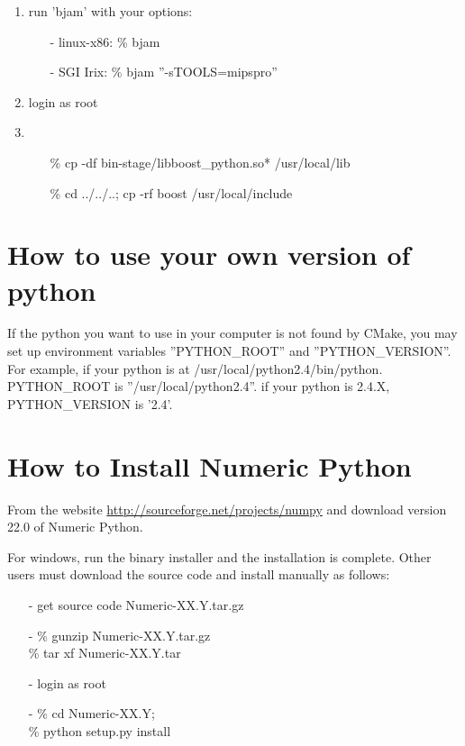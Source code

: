 \begin{enumerate}
     \item
       run 'bjam' with your options:
       \begin{itemize}
	 \item[-] linux-x86: {\% bjam}
	 \item[-] SGI Irix: {\% bjam ''-sTOOLS=mipspro''}
       \end{itemize}

     \item
       login as root
    
     \item

       \begin{itemize}
	 \item[\%] cp -df bin-stage/libboost\_python.so* /usr/local/lib
	 \item[\%] cd ../../..; cp -rf boost /usr/local/include
       \end{itemize}
       \normalcolor

  \end{enumerate}


\section{How to use your own version of python}

   If the python you want to use in your computer is not found by CMake,
    you may set up environment variables ''PYTHON\_ROOT'' and
    ''PYTHON\_VERSION''. For example, if your python is at
    /usr/local/python2.4/bin/python. PYTHON\_ROOT is
    ''/usr/local/python2.4''. if your python is 2.4.X, PYTHON\_VERSION
    is '2.4'.

\section{How to Install Numeric Python}
   From the website
    \href{http://sourceforge.net/projects/numpy}{http://sourceforge.net/projects/numpy}
    and download 
    version 22.0 of Numeric Python.
 
    For windows, run the binary installer and the installation is
    complete.  Other users must download the source code and install
    manually as follows:

    \begin{itemize}
      \item[-] get source code Numeric-XX.Y.tar.gz

      \item[-] \% gunzip Numeric-XX.Y.tar.gz \\
	\% tar xf Numeric-XX.Y.tar
      \normalcolor
      \item[-] login as root

      \item[-] \% cd Numeric-XX.Y; \\
	\% python setup.py install
      \normalcolor
    \end{itemize}



%